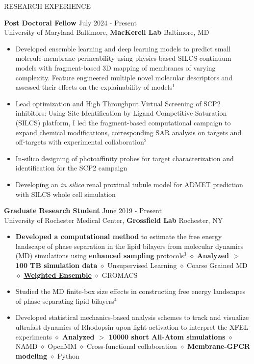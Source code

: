 \documentclass{resume} %
\begin{document}
\begin{rSection}{RESEARCH EXPERIENCE}

   \textbf{Post Doctoral Fellow} \hfill July 2024 - Present\\
   University of Maryland Baltimore, \textbf{MacKerell Lab} \hfill Baltimore, MD
   \begin{itemize}
      \itemsep -1pt {}
      \item Developed ensemble learning and deep learning models to predict small molecule membrane permeability using physics-based SILCS continuum models with fragment-based 3D mapping of membranes of varying complexity. Feature engineered multiple novel molecular descriptors and assessed their effects on the explainability of models$^1$   
      \item Lead optimization and High Throughput Virtual Screening of SCP2 inhibitors: Using Site Identification by Ligand Competitive Saturation (SILCS) platform, I led the fragment-based computational campaign to expand chemical modifications, corresponding SAR analysis on targets and off-targets with experimental collaboration$^2$
      \item In-silico designing of photoaffinity probes for target characterization and identification for the SCP2 campaign
      \item Developing an \textit{in silico} renal proximal tubule model for ADMET prediction with SILCS whole cell simulation
   \end{itemize}

   \textbf{Graduate Research Student} \hfill June 2019 - Present\\
   University of Rochester Medical Center, \textbf{Grossfield Lab} \hfill Rochester, NY
   \begin{itemize}
      \itemsep -1pt {}
      \item \textbf{Developed a computational method} to estimate the free energy landscape of phase separation in the lipid bilayers from molecular dynamics (MD) simulations using \textbf{enhanced sampling} protocols$^{3}$
            $\diamond$ \textbf{Analyzed $>$ 100 TB simulation data} $\diamond$ Unsupervised Learning $\diamond$ Coarse Grained MD $\diamond$ \textbf{\href{https://x.com/poruthoor/status/1631815905557479426?s=20}{Weighted Ensemble}} $\diamond$ GROMACS
      \item Studied the MD finite-box size effects in constructing free energy landscapes of phase separating lipid bilayers${^4}$
      \item Developed statistical mechanics-based analysis schemes to track and visualize ultrafast dynamics of Rhodopsin upon light activation to interpret the XFEL experiments \textbf{$\diamond$ Analyzed $>$ 10000 short All-Atom simulations}
            $\diamond$ NAMD $\diamond$ OpenMM $\diamond$ Cross-functional collaboration $\diamond$  \textbf{Membrane-GPCR modeling} $\diamond$ Python
   \end{itemize}


\end{rSection}
\end{document}
